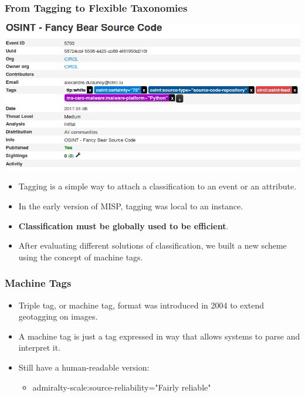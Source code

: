 
\begin{frame}[t,plain]
\titlepage
\end{frame}

\begin{frame}
\frametitle{From Tagging to Flexible Taxonomies}
\includegraphics[scale=0.3]{tags.png}
\begin{itemize}
   \item Tagging is a simple way to attach a classification to an event or an attribute.
   \item In the early version of MISP, tagging was local to an instance.
   \item {\bf Classification must be globally used to be efficient}.
   \item After evaluating different solutions of classification, we built a new scheme using the concept of machine tags.
\end{itemize}
\end{frame}

\begin{frame}
\frametitle{Machine Tags}
        \begin{itemize}
                \item Triple tag, or machine tag, format was introduced in 2004 to extend geotagging on images.
        \end{itemize}
        {
                \setlength{\fboxsep}{1pt}
                \setlength{\fboxrule}{1pt}
        }
        \begin{itemize}
        \item A machine tag is just a tag expressed in way that allows systems to parse and interpret it.
        \item Still have a human-readable version:\\
        \begin{itemize}
                \item admiralty-scale:source-reliability="Fairly reliable"
        \end{itemize}
        \end{itemize}
\end{frame}

